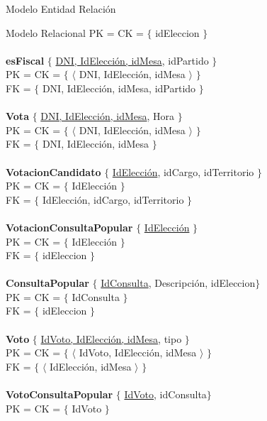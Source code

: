 \begin{section}{Modelo Entidad Relaci\'on}
\begin{subsection}{Modelo Relacional}
PK = CK = $ \lbrace $ idEleccion $ \rbrace $ \\
\\
\textbf{esFiscal} $ \lbrace $ \underline{DNI, IdElecci\'on, idMesa}, idPartido $ \rbrace $ \\
PK = CK = $ \lbrace $ $ \langle $ DNI, IdElecci\'on, idMesa $ \rangle $ $ \rbrace $ \\
FK = $ \lbrace $ DNI, IdElecci\'on, idMesa, idPartido $ \rbrace $\\
\\
\textbf{Vota} $ \lbrace $ \underline{DNI, IdElecci\'on, idMesa}, Hora $ \rbrace $ \\
PK = CK = $ \lbrace $ $ \langle $ DNI, IdElecci\'on, idMesa $ \rangle $ $ \rbrace $ \\
FK = $ \lbrace $ DNI, IdElecci\'on, idMesa $ \rbrace $\\
\\
\textbf{VotacionCandidato} $ \lbrace $ \underline{IdElecci\'on}, idCargo, idTerritorio $ \rbrace $ \\
PK = CK = $ \lbrace $ IdElecci\'on $ \rbrace $ \\
FK = $ \lbrace $ IdElecci\'on, idCargo, idTerritorio $ \rbrace $\\
\\
\textbf{VotacionConsultaPopular} $ \lbrace $ \underline{IdElecci\'on} $ \rbrace $ \\
PK = CK = $ \lbrace $ IdElecci\'on $ \rbrace $ \\
FK = $ \lbrace $ idEleccion $ \rbrace $\\
\\
\textbf{ConsultaPopular} $ \lbrace $ \underline{IdConsulta}, Descripci\'on, idEleccion$ \rbrace $ \\
PK = CK = $ \lbrace $ IdConsulta $ \rbrace $ \\
FK = $ \lbrace $ idEleccion $ \rbrace $\\
\\
\textbf{Voto} $ \lbrace $ \underline{IdVoto, IdElecci\'on, idMesa}, tipo $ \rbrace $ \\
PK = CK = $ \lbrace $ $ \langle $ IdVoto, IdElecci\'on, idMesa $ \rangle $  $ \rbrace $ \\
FK = $ \lbrace $ $ \langle $ IdElecci\'on, idMesa $ \rangle $ $ \rbrace $\\
\\
\textbf{VotoConsultaPopular} $ \lbrace $ \underline{IdVoto}, idConsulta$ \rbrace $ \\
PK = CK = $ \lbrace $  IdVoto $ \rbrace $ \\

\end{subsection}
\end{section}
